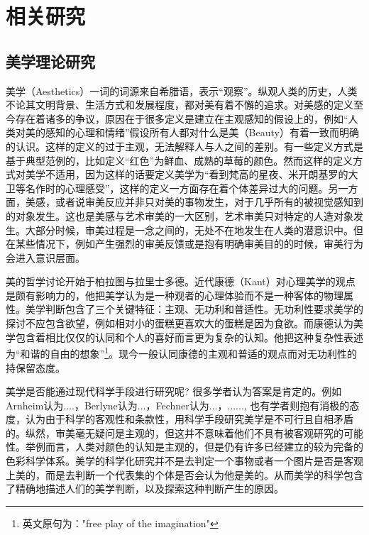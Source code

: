 \chapter{相关研究}
\label{chap:related}

\section{美学理论研究}
美学（Aesthetics）一词的词源来自希腊语，表示“观察”。纵观人类的历史，人类不论其文明背景、生活方式和发展程度，都对美有着不懈的追求。对美感的定义至今存在着诸多的争议，原因在于很多定义是建立在主观感知的假设上的，例如“人类对美的感知的心理和情绪”假设所有人都对什么是美（Beauty）有着一致而明确的认识。这样的定义的过于主观，无法解释人与人之间的差别。有一些定义方式是基于典型范例的，比如定义“红色”为鲜血、成熟的草莓的颜色。然而这样的定义方式对美学不适用，因为这样的话要定义美学为“看到梵高的星夜、米开朗基罗的大卫等名作时的心理感受”，这样的定义一方面存在着个体差异过大的问题。另一方面，美感，或者说审美反应并非只对美的事物发生，对于几乎所有的被视觉感知到的对象发生。这也是美感与艺术审美的一大区别，艺术审美只对特定的人造对象发生。大部分时候，审美过程是一念之间的，无处不在地发生在人类的潜意识中。但在某些情况下，例如产生强烈的审美反馈或是抱有明确审美目的的时候，审美行为会进入意识层面。

美的哲学讨论开始于柏拉图与拉里士多德。近代康德（Kant）对心理美学的观点是颇有影响力的，他把美学认为是一种观者的心理体验而不是一种客体的物理属性。美学判断包含了三个关键特征：主观、无功利和普适性。无功利性要求美学的探讨不应包含欲望，例如相对小的蛋糕更喜欢大的蛋糕是因为食欲。而康德认为美学包含着相比仅仅的认同和个人的喜好而言更为复杂的认知。他把这种复杂性表述为“和谐的自由的想象”\footnote{英文原句为："free play of the imagination"}。现今一般认同康德的主观和普适的观点而对无功利性的持保留态度。

美学是否能通过现代科学手段进行研究呢? 很多学者认为答案是肯定的。例如Arnheim认为....，Berlyne认为...，Fechner认为...，......, 也有学者则抱有消极的态度，认为由于科学的客观性和条款性，用科学手段研究美学是不可行且自相矛盾的。纵然，审美毫无疑问是主观的，但这并不意味着他们不具有被客观研究的可能性。举例而言，人类对颜色的认知是主观的，但是仍有许多已经建立的较为完备的色彩科学体系。美学的科学化研究并不是去判定一个事物或者一个图片是否是客观上美的，而是去判断一个代表集的个体是否会认为他是美的。从而美学的科学包含了精确地描述人们的美学判断，以及探索这种判断产生的原因。

